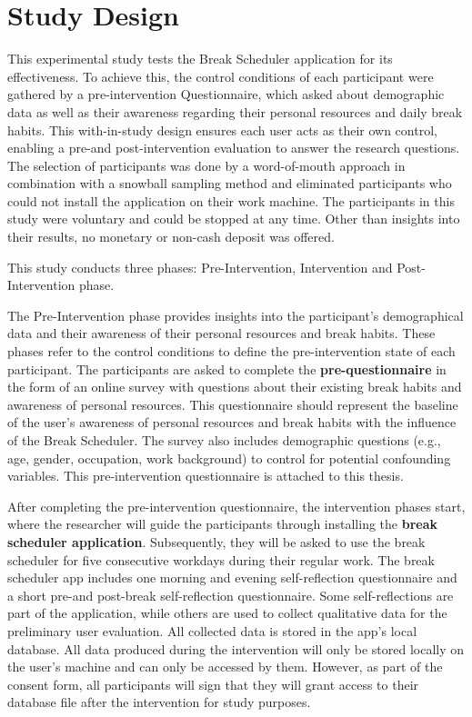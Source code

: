 \documentclass{hasel_thesis}
\begin{document}
\section{Study Design}

This experimental study tests the Break Scheduler application for its effectiveness. To achieve this, the control conditions of each participant were gathered by a pre-intervention Questionnaire, which asked about demographic data as well as their awareness regarding their personal resources and daily break habits. This with-in-study design ensures each user acts as their own control, enabling a pre-and post-intervention evaluation to answer the research questions. The selection of participants was done by a word-of-mouth approach in combination with a snowball sampling method and eliminated participants who could not install the application on their work machine. The participants in this study were voluntary and could be stopped at any time. Other than insights into their results, no monetary or non-cash deposit was offered.

This study conducts three phases: Pre-Intervention, Intervention and Post-Intervention phase. 

The Pre-Intervention phase provides insights into the participant's demographical data and their awareness of their personal resources and break habits. These phases refer to the control conditions to define the pre-intervention state of each participant. The participants are asked to complete the \textbf{pre-questionnaire} in the form of an online survey with questions about their existing break habits and awareness of personal resources. This questionnaire should represent the baseline of the user's awareness of personal resources and break habits with the influence of the Break Scheduler. The survey also includes demographic questions (e.g., age, gender, occupation, work background) to control for potential confounding variables. This pre-intervention questionnaire is attached to this thesis.

After completing the pre-intervention questionnaire, the intervention phases start, where the researcher will guide the participants through installing the \textbf{break scheduler application}. Subsequently, they will be asked to use the break scheduler for five consecutive workdays during their regular work. The break scheduler app includes one morning and evening self-reflection questionnaire and a short pre-and post-break self-reflection questionnaire. Some self-reflections are part of the application, while others are used to collect qualitative data for the preliminary user evaluation. All collected data is stored in the app's local database. All data produced during the intervention will only be stored locally on the user's machine and can only be accessed by them. However, as part of the consent form, all participants will sign that they will grant access to their database file after the intervention for study purposes.
\end{document}
